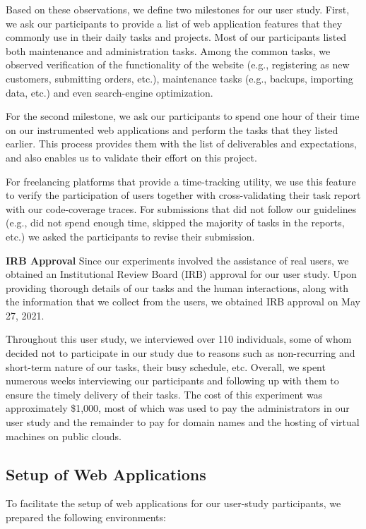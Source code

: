 Based on these observations, we define two milestones for our user study. 
First, we ask our participants to provide a list of web application features that they commonly use in their daily tasks and projects. 
Most of our participants listed both maintenance and administration tasks. 
Among the common tasks, we observed verification of the functionality of the website (e.g., registering as new customers, submitting orders, etc.), maintenance tasks (e.g., backups, importing data, etc.) and even search-engine optimization. 

For the second milestone, we ask our participants to spend one hour of their time on our instrumented web applications and perform the tasks that they listed earlier. 
This process provides them with the list of deliverables and expectations, and also enables us to validate their effort on this project. 

For freelancing platforms that provide a time-tracking utility, we use this feature to verify the participation of users together with cross-validating their task report with our code-coverage traces. 
For submissions that did not follow our guidelines (e.g., did not spend enough time, skipped the majority of tasks in the reports, etc.) we asked the participants to revise their submission. 

\textbf{IRB Approval} Since our experiments involved the assistance of real users, we obtained an Institutional Review Board (IRB) approval for our user study. 
Upon providing thorough details of our tasks and the human interactions, along with the information that we collect from the users, we obtained IRB approval on May 27, 2021. 

Throughout this user study, we interviewed over 110 individuals, some of whom decided not to participate in our study due to reasons such as non-recurring and short-term nature of our tasks, their busy schedule, etc.
Overall, we spent numerous weeks interviewing our participants and following up with them to ensure the timely delivery of their tasks. The cost of this experiment was approximately \$1,000, most of which was used to pay the administrators in our user study and the remainder to pay for domain names and the hosting of virtual machines on public clouds.

\subsection{Setup of Web Applications}

To facilitate the setup of web applications for our user-study participants, we prepared the following environments:

